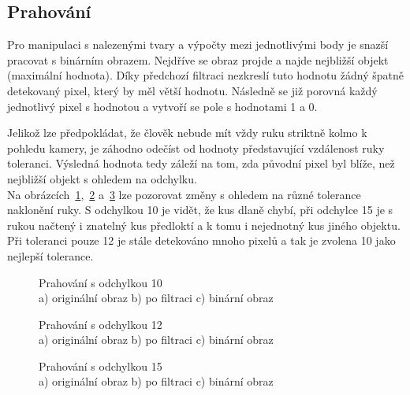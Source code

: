 \subsection{Prahování}
Pro manipulaci s nalezenými tvary a výpočty mezi jednotlivými body je snazší pracovat s binárním obrazem. Nejdříve se obraz projde a najde nejbližší objekt (maximální hodnota). Díky předchozí filtraci nezkreslí tuto hodnotu žádný špatně detekovaný pixel, který by měl větší hodnotu. Následně se již porovná každý jednotlivý pixel s hodnotou a vytvoří se pole s hodnotami 1 a 0.

Jelikož lze předpokládat, že člověk nebude mít vždy ruku striktně kolmo k pohledu kamery, je záhodno odečíst od hodnoty představující vzdálenost ruky toleranci. Výsledná hodnota tedy záleží na tom, zda původní pixel byl blíže, než nejbližší objekt s ohledem na odchylku.\\
Na obrázcích~\ref{pic12},~\ref{pic13} a~\ref{pic14} lze pozorovat změny s ohledem na různé tolerance naklonění ruky. S odchylkou 10 je vidět, že kus dlaně chybí, při odchylce 15 je s rukou načtený i znatelný kus předloktí a k tomu i nejednotný kus jiného objektu. Při toleranci pouze 12 je stále detekováno mnoho pixelů a tak je zvolena 10 jako nejlepší tolerance.\\

\begin{figure}[htp]
\centering
{} \hfill
{} \hfill
{}
\caption{Prahování s odchylkou 10 \\ a) originální obraz b) po filtraci c) binární obraz}
\label{pic12}
\end{figure}
\begin{figure}[htp]
\centering
{} \hfill
{} \hfill
{}
\caption{Prahování s odchylkou 12 \\ a) originální obraz b) po filtraci c) binární obraz}
\label{pic13}
\end{figure}
\begin{figure}[htp]
\centering
{} \hfill
{} \hfill
{}
\caption{Prahování s odchylkou 15 \\ a) originální obraz b) po filtraci c) binární obraz}
\label{pic14}
\end{figure}
\newpage
